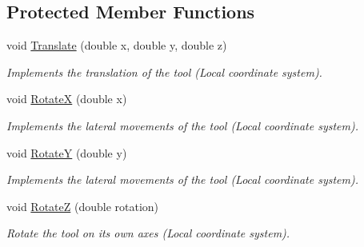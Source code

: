 \subsection*{Protected Member Functions}
\begin{DoxyCompactItemize}
\item 
void \hyperlink{classvtkTool_a4749077c4b6e05d9dc965a94c0ca14a0}{Translate} (double x, double y, double z)
\begin{DoxyCompactList}\small\item\em Implements the translation of the tool (Local coordinate system). \item\end{DoxyCompactList}\item 
void \hyperlink{classvtkTool_a34b408444b681853b5dabbda6b971223}{RotateX} (double x)
\begin{DoxyCompactList}\small\item\em Implements the lateral movements of the tool (Local coordinate system). \item\end{DoxyCompactList}\item 
void \hyperlink{classvtkTool_ad37e6208805e0fddd07dfc783a70fceb}{RotateY} (double y)
\begin{DoxyCompactList}\small\item\em Implements the lateral movements of the tool (Local coordinate system). \item\end{DoxyCompactList}\item 
void \hyperlink{classvtkTool_a80c0ca1937ce97c98d70364cac281ff2}{RotateZ} (double rotation)
\begin{DoxyCompactList}\small\item\em Rotate the tool on its own axes (Local coordinate system). \item\end{DoxyCompactList}\end{DoxyCompactItemize}
